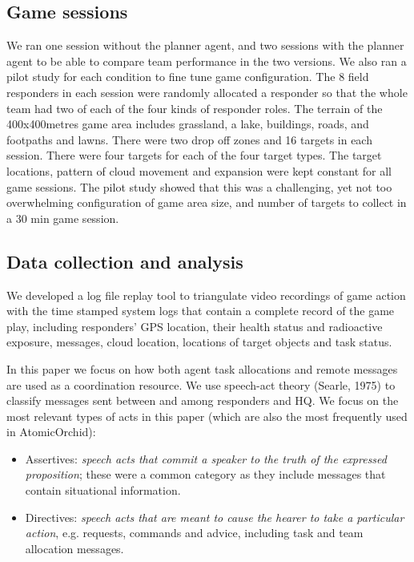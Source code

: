 \subsection{Game sessions}
We ran one session without the planner agent, and two sessions with the planner agent to be able to compare team performance in the two versions. We also ran a pilot study for each condition to fine tune game configuration. The 8 field responders in each session were randomly allocated a responder so that the whole team had two of each of the four kinds of responder roles. The terrain of the 400x400metres game area includes grassland, a lake, buildings, roads, and footpaths and lawns. There were two drop off zones and 16 targets in each session. There were four targets for each of the four target types. The target locations, pattern of cloud movement and expansion were kept constant for all game sessions. The pilot study showed that this was a challenging, yet not too overwhelming configuration of game area size, and number of targets to collect in a 30 min game session. 

\subsection{Data collection and analysis}
We developed a log file replay tool to triangulate video recordings of game action with the time stamped system logs that contain a complete record of the game play, including responders' GPS location, their health status and radioactive exposure, messages, cloud location, locations of target objects and task status.


In this paper we focus on how both agent task allocations and remote messages are used as a coordination resource. We use speech-act theory (Searle, 1975) to classify messages sent between and among responders and HQ. We focus on the most relevant types of acts in this paper (which are also the most frequently used in AtomicOrchid):

\begin{itemize}
\item Assertives: \textit{speech acts that commit a speaker to the truth of the expressed proposition}; these were a common category as they include messages that contain situational information.
\item Directives: \textit{speech acts that are meant to cause the hearer to take a particular action}, e.g. requests, commands and advice, including task and team allocation messages. 
\end{itemize}

